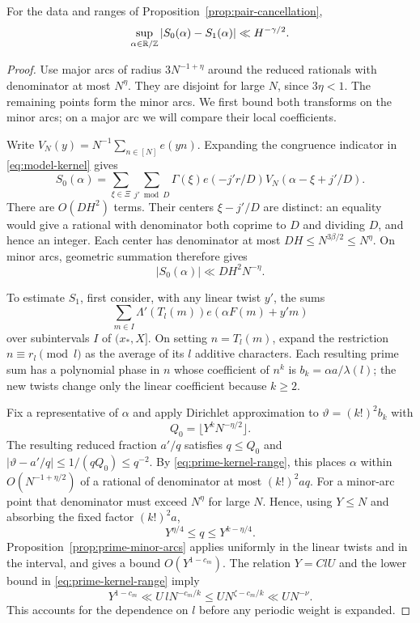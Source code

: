 \begin{lemma}\label{lem:kernel-comparison}
For the data and ranges of Proposition~\ref{prop:pair-cancellation},
\begin{equation}\label{eq:kernel-comparison}
 \sup_{\alpha\in\mathbb R/\mathbb Z}|S_0(\alpha)-S_1(\alpha)|
 \ll H^{-\gamma/2}.
\end{equation}
\end{lemma}

\begin{proof}
Use major arcs of radius $3N^{-1+\eta}$ around the reduced rationals with
denominator at most $N^\eta$.  They are disjoint for large $N$, since
$3\eta<1$.  The remaining points form the minor arcs.  We first bound both
transforms on the minor arcs; on a major arc we will compare their local
coefficients.

Write $V_N(y)=N^{-1}\sum_{n\in[N]}e(yn)$.  Expanding the congruence
indicator in \eqref{eq:model-kernel} gives
\begin{equation}\label{eq:model-transform}
 S_0(\alpha)=\sum_{\xi\in\Xi}\sum_{j'\bmod D}
 \Gamma(\xi)e(-j'r/D)V_N(\alpha-\xi+j'/D).
\end{equation}
There are $O(DH^2)$ terms.  Their centers $\xi-j'/D$ are distinct:
an equality would give a rational with denominator both coprime to $D$
and dividing $D$, and hence an integer.  Each center has denominator at
most $DH\le N^{3\beta/2}\le N^\eta$.  On minor arcs, geometric summation
therefore gives
\begin{equation}\label{eq:model-minor}
 |S_0(\alpha)|\ll DH^2N^{-\eta}.
\end{equation}

To estimate $S_1$, first consider, with any linear twist $y'$, the sums
\[
 \sum_{m\in I}\Lambda'(T_l(m))e(\alpha F(m)+y'm)
\]
over subintervals $I$ of $(x_*,X]$.  On setting $n=T_l(m)$, expand the
restriction $n\equiv r_l\pmod l$ as the average of its $l$ additive
characters.  Each resulting prime sum has a polynomial phase in $n$ whose
coefficient of $n^k$ is $b_k=\alpha a/\lambda(l)$; the new twists change
only the linear coefficient because $k\ge2$.

Fix a representative of $\alpha$ and apply Dirichlet approximation to
$\vartheta=(k!)^2b_k$ with
\[
 Q_0=\lfloor Y^kN^{-\eta/2}\rfloor.
\]
The resulting reduced fraction $a'/q$ satisfies
$q\le Q_0$ and $|\vartheta-a'/q|\le1/(qQ_0)\le q^{-2}$.
By \eqref{eq:prime-kernel-range}, this places $\alpha$ within
$O(N^{-1+\eta/2})$ of a rational of denominator at most $(k!)^2aq$.
For a minor-arc point that denominator must exceed $N^\eta$ for large
$N$.  Hence, using $Y\le N$ and absorbing the fixed factor $(k!)^2a$,
\[
 Y^{\eta/4}\le q\le Y^{k-\eta/4}.
\]
Proposition~\ref{prop:prime-minor-arcs} applies uniformly in the linear
twists and in the interval, and gives a bound $O(Y^{1-c_m})$.
The relation $Y=ClU$ and the lower bound in
\eqref{eq:prime-kernel-range} imply
\[
 Y^{1-c_m}\ll U\,lN^{-c_m/k}
 \le U N^{\zeta-c_m/k}\ll U N^{-\nu}.
\]
This accounts for the dependence on $l$ before any periodic weight is
expanded.


\end{proof}
